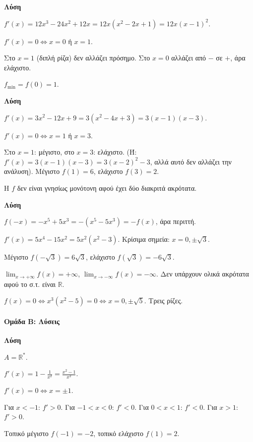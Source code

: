 \documentclass[11pt,a4paper,modern]{FFExercises}
\begin{document}
\askhsh %
\textbf{Λύση}
\begin{alist}
    \item $f'(x) = 12x^3 - 24x^2 + 12x = 12x(x^2 - 2x + 1) = 12x(x-1)^2$.
    \item $f'(x) = 0 \Leftrightarrow x = 0$ ή $x = 1$.
    \item Στο $x = 1$ (διπλή ρίζα) δεν αλλάζει πρόσημο. Στο $x = 0$ αλλάζει από $-$ σε $+$, άρα ελάχιστο.
    \item $f_{\min} = f(0) = 1$.
\end{alist}

\askhsh %
\textbf{Λύση}
\begin{alist}
    \item $f'(x) = 3x^2 - 12x + 9 = 3(x^2 - 4x + 3) = 3(x-1)(x-3)$.
    \item $f'(x) = 0 \Leftrightarrow x = 1$ ή $x = 3$.
    \item Στο $x = 1$: μέγιστο, στο $x = 3$: ελάχιστο. (Ή: $f'(x) = 3(x-1)(x-3) = 3(x-2)^2 - 3$, αλλά αυτό δεν αλλάζει την ανάλυση). Μέγιστο $f(1) = 6$, ελάχιστο $f(3) = 2$.
    \item Η $f$ δεν είναι γνησίως μονότονη αφού έχει δύο διακριτά ακρότατα.
\end{alist}

\askhsh %
\textbf{Λύση}
\begin{alist}
    \item $f(-x) = -x^5 + 5x^3 = -(x^5 - 5x^3) = -f(x)$, άρα περιττή.
    \item $f'(x) = 5x^4 - 15x^2 = 5x^2(x^2 - 3)$. Κρίσιμα σημεία: $x = 0, \pm\sqrt{3}$.
    \item Μέγιστο $f(-\sqrt{3}) = 6\sqrt{3}$, ελάχιστο $f(\sqrt{3}) = -6\sqrt{3}$.
    \item $\lim_{x \to +\infty} f(x) = +\infty$, $\lim_{x \to -\infty} f(x) = -\infty$. Δεν υπάρχουν ολικά ακρότατα αφού το σ.τ. είναι $\mathbb{R}$.
    \item $f(x) = 0 \Leftrightarrow x^3(x^2 - 5) = 0 \Leftrightarrow x = 0, \pm\sqrt{5}$. Τρεις ρίζες.
\end{alist}

\paragraph{Ομάδα Β: Λύσεις}

\askhsh %
\textbf{Λύση}
\begin{alist}
    \item $A = \mathbb{R}^*$.
    \item $f'(x) = 1 - \frac{1}{x^2} = \frac{x^2 - 1}{x^2}$.
    \item $f'(x) = 0 \Leftrightarrow x = \pm 1$.
    \item Για $x < -1$: $f' > 0$. Για $-1 < x < 0$: $f' < 0$. Για $0 < x < 1$: $f' < 0$. Για $x > 1$: $f' > 0$.
    \item Τοπικό μέγιστο $f(-1) = -2$, τοπικό ελάχιστο $f(1) = 2$.
\end{alist}
\end{document}
